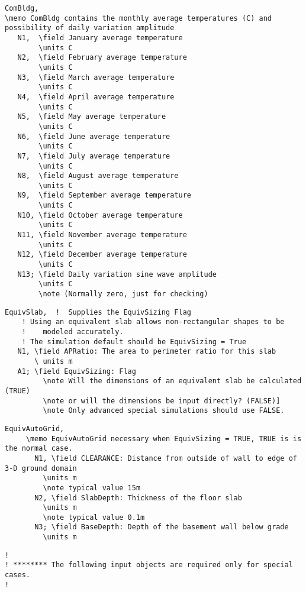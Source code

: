 \begin{lstlisting}
ComBldg,
\memo ComBldg contains the monthly average temperatures (C) and possibility of daily variation amplitude
   N1,  \field January average temperature
        \units C
   N2,  \field February average temperature
        \units C
   N3,  \field March average temperature
        \units C
   N4,  \field April average temperature
        \units C
   N5,  \field May average temperature
        \units C
   N6,  \field June average temperature
        \units C
   N7,  \field July average temperature
        \units C
   N8,  \field August average temperature
        \units C
   N9,  \field September average temperature
        \units C
   N10, \field October average temperature
        \units C
   N11, \field November average temperature
        \units C
   N12, \field December average temperature
        \units C
   N13; \field Daily variation sine wave amplitude
        \units C
        \note (Normally zero, just for checking)
\end{lstlisting}

\begin{lstlisting}
EquivSlab,  !  Supplies the EquivSizing Flag
    ! Using an equivalent slab allows non-rectangular shapes to be
    !    modeled accurately.
    ! The simulation default should be EquivSizing = True
   N1, \field APRatio: The area to perimeter ratio for this slab
       \ units m
   A1; \field EquivSizing: Flag
         \note Will the dimensions of an equivalent slab be calculated (TRUE)
         \note or will the dimensions be input directly? (FALSE)]
         \note Only advanced special simulations should use FALSE.
\end{lstlisting}

\begin{lstlisting}
EquivAutoGrid,
     \memo EquivAutoGrid necessary when EquivSizing = TRUE, TRUE is is the normal case.
       N1, \field CLEARANCE: Distance from outside of wall to edge of 3-D ground domain
         \units m
         \note typical value 15m
       N2, \field SlabDepth: Thickness of the floor slab
         \units m
         \note typical value 0.1m
       N3; \field BaseDepth: Depth of the basement wall below grade
         \units m
\end{lstlisting}

\begin{lstlisting}
!
! ******** The following input objects are required only for special cases.
!
\end{lstlisting}


